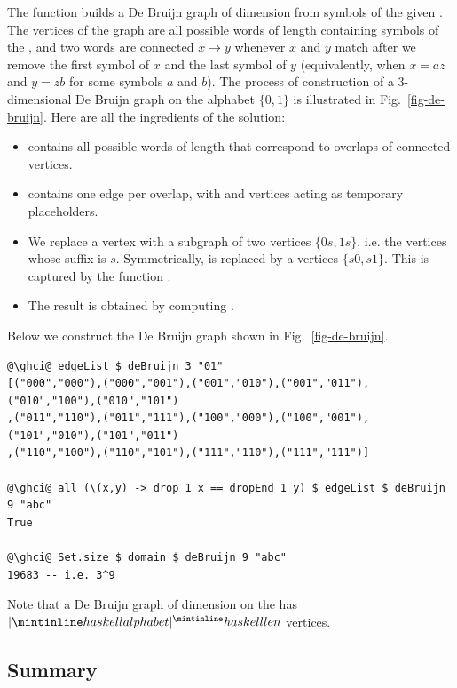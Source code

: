 The function builds a De Bruijn graph of dimension  from symbols of the given
. The vertices of the graph are all possible words of length 
containing symbols of the , and two words are connected $x \rightarrow y$
whenever $x$ and $y$ match after we remove the first symbol of $x$ and the last symbol
of $y$ (equivalently, when $x = az$ and $y = zb$ for some symbols $a$ and $b$).
The process of construction of a 3-dimensional De Bruijn graph on the alphabet
$\{0, 1\}$ is illustrated in Fig.~\ref{fig-de-bruijn}. Here are all the ingredients
of the solution:
\begin{itemize}
    \item {} contains all possible words of length  that
    correspond to overlaps of connected vertices.
    \item {} contains one edge per overlap, with  and
     vertices acting as temporary placeholders.
    \item We replace a vertex  with a subgraph of two vertices
    $\{0s, 1s\}$, i.e. the vertices whose suffix is $s$. Symmetrically,
     is replaced by a vertices $\{s0, s1\}$. This is captured
    by the function .
    \item The result is obtained by computing   .
\end{itemize}

Below we construct the De Bruijn graph shown in Fig.~\ref{fig-de-bruijn}.
\begin{verbatim}
@\ghci@ edgeList $ deBruijn 3 "01"
[("000","000"),("000","001"),("001","010"),("001","011"),("010","100"),("010","101")
,("011","110"),("011","111"),("100","000"),("100","001"),("101","010"),("101","011")
,("110","100"),("110","101"),("111","110"),("111","111")]

@\ghci@ all (\(x,y) -> drop 1 x == dropEnd 1 y) $ edgeList $ deBruijn 9 "abc"
True

@\ghci@ Set.size $ domain $ deBruijn 9 "abc"
19683 -- i.e. 3^9
\end{verbatim}

\noindent
Note that a De Bruijn graph of dimension  on the  has
$|\hs{alphabet}|^\hs{len}$ vertices.

\subsection{Summary}\label{sub-library-summary}

